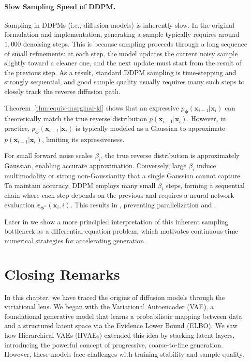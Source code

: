 \paragraph{Slow Sampling Speed of DDPM.} Sampling in DDPMs (i.e., diffusion models) is inherently slow. In the original formulation and implementation, generating a sample typically requires around $1{,}000$ denoising steps. This is because sampling proceeds through a long sequence of small refinements: at each step, the model updates the current noisy sample slightly toward a cleaner one, and the next update must start from the result of the previous step. As a result, standard DDPM sampling is time-stepping and strongly sequential, and good sample quality usually requires many such steps to closely track the reverse diffusion path.

Theorem~\ref{thm:equiv-marginal-kl} shows that an expressive $ p_{\bm{\phi}}(\mathbf{x}_{i-1} | \mathbf{x}_i) $ can theoretically match the true reverse distribution $ p(\mathbf{x}_{i-1} | \mathbf{x}_i) $. However, in practice, $ p_{\bm{\phi}}(\mathbf{x}_{i-1} | \mathbf{x}_i) $ is typically modeled as a Gaussian to approximate $ p(\mathbf{x}_{i-1} | \mathbf{x}_i) $, limiting its expressiveness.

For small forward noise scales $\beta_i$, the true reverse distribution is approximately Gaussian, enabling accurate approximation. Conversely, large $\beta_i$ induce multimodality or strong non-Gaussianity that a single Gaussian cannot capture. To maintain accuracy, DDPM employs many small $\beta_i$ steps, forming a sequential chain where each step depends on the previous and requires a neural network evaluation $\boldsymbol{\epsilon}_{\bm{\phi}^\times}(\mathbf{x}_i, i)$. This results in , preventing parallelization and .



Later in  we show a more principled interpretation of this inherent sampling bottleneck as a differential-equation problem, which motivates continuous-time numerical strategies for accelerating generation.



\newpage
\section{Closing Remarks}\label{sec:ch2_cr}


In this chapter, we have traced the origins of diffusion models through the variational lens. We began with the Variational Autoencoder (VAE), a foundational generative model that learns a probabilistic mapping between data and a structured latent space via the Evidence Lower Bound (ELBO). We saw how Hierarchical VAEs (HVAEs) extended this idea by stacking latent layers, introducing the powerful concept of progressive, coarse-to-fine generation. However, these models face challenges with training stability and sample quality.





